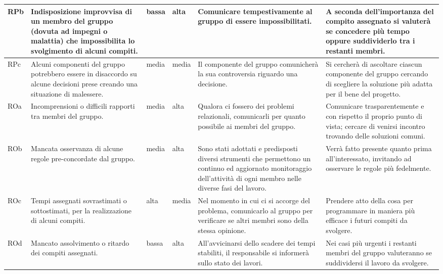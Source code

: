 {\begin{longtable}{|p{0.8cm}|p{3cm}|p{1cm}|p{1cm}|p{3cm}|p{3.2cm}|}
        \hline
        RPb &
        Indisposizione improvvisa di un membro del gruppo (dovuta ad impegni o malattia) che impossibilita lo svolgimento di alcuni compiti. &
        bassa &
        alta &
        Comunicare tempestivamente al gruppo di essere impossibilitati. &
        A seconda dell'importanza del compito assegnato si valuterà se concedere più tempo oppure suddividerlo tra i restanti membri. \\
        \hline
        RPc &
        Alcuni componenti del
        gruppo potrebbero essere
        in disaccordo su alcune
        decisioni prese creando
        una situazione di
        malessere. &
        media &
        media &
        Il componente del gruppo comunicherà la sua
controversia riguardo una
decisione. &
Si cercherà di ascoltare
ciascun componente del gruppo
cercando di scegliere la
soluzione più adatta per il bene
del progetto. \\
        \hline
        ROa &
        Incomprensioni o difficili rapporti tra membri del gruppo. &
        media &
        alta &
        Qualora ci fossero dei problemi relazionali, comunicarli per quanto possibile ai membri del gruppo. &
        Comunicare trasparentemente e con rispetto il proprio punto di vista; cercare di venirsi incontro trovando delle soluzioni comuni. \\
        \hline
        ROb &
        Mancata osservanza di alcune regole pre-concordate dal gruppo. &
        media &
        alta &
        Sono stati adottati e predisposti diversi strumenti che permettono un continuo ed aggiornato monitoraggio dell'attività di ogni membro nelle diverse fasi del lavoro. &
        Verrà fatto presente quanto prima all'interessato, invitando ad osservare le regole più fedelmente. \\
        \hline
        ROc &
        Tempi assegnati sovrastimati o sottostimati, per la realizzazione di alcuni compiti. &
        alta &
        media &
        Nel momento in cui ci si accorge del problema, comunicarlo al gruppo per verificare se altri membri sono della stessa opinione. &
        Prendere atto della cosa per programmare in maniera più efficace i futuri compiti da svolgere. \\
        \hline
        ROd &
        Mancato assolvimento o ritardo dei compiti assegnati. &
        bassa &
        alta &
        All'avvicinarsi dello scadere dei tempi stabiliti, il responsabile si informerà sullo stato dei lavori. &
        Nei casi più urgenti i restanti membri del gruppo valuteranno se suddividersi il lavoro da svolgere. \\

\end{longtable}}
